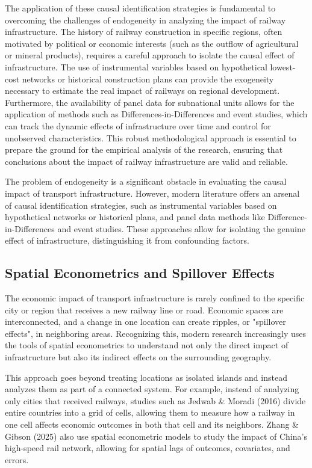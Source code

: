 \documentclass[12pt, a4paper]{article}
\begin{document}
The application of these causal identification strategies is fundamental to overcoming the challenges of endogeneity in analyzing the impact of railway infrastructure. The history of railway construction in specific regions, often motivated by political or economic interests (such as the outflow of agricultural or mineral products), requires a careful approach to isolate the causal effect of infrastructure. The use of instrumental variables based on hypothetical lowest-cost networks or historical construction plans can provide the exogeneity necessary to estimate the real impact of railways on regional development. Furthermore, the availability of panel data for subnational units allows for the application of methods such as Differences-in-Differences and event studies, which can track the dynamic effects of infrastructure over time and control for unobserved characteristics. This robust methodological approach is essential to prepare the ground for the empirical analysis of the research, ensuring that conclusions about the impact of railway infrastructure are valid and reliable.

The problem of endogeneity is a significant obstacle in evaluating the causal impact of transport infrastructure. However, modern literature offers an arsenal of causal identification strategies, such as instrumental variables based on hypothetical networks or historical plans, and panel data methods like Difference-in-Differences and event studies. These approaches allow for isolating the genuine effect of infrastructure, distinguishing it from confounding factors. 


\subsection{Spatial Econometrics and Spillover Effects}
The economic impact of transport infrastructure is rarely confined to the specific city or region that receives a new railway line or road. Economic spaces are interconnected, and a change in one location can create ripples, or "spillover effects", in neighboring areas. Recognizing this, modern research increasingly uses the tools of spatial econometrics to understand not only the direct impact of infrastructure but also its indirect effects on the surrounding geography. 


This approach goes beyond treating locations as isolated islands and instead analyzes them as part of a connected system. For example, instead of analyzing only cities that received railways, studies such as Jedwab \& Moradi (2016) divide entire countries into a grid of cells, allowing them to measure how a railway in one cell affects economic outcomes in both that cell and its neighbors. Zhang \& Gibson (2025) also use spatial econometric models to study the impact of China's high-speed rail network, allowing for spatial lags of outcomes, covariates, and errors. 
\end{document}
